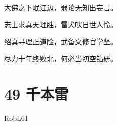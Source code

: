 \documentclass[UTF8,12pt,oneside]{ctexbook}
\begin{document}
        \begin{center}
            大佛之下岷江边，弱论无知出妄言。
       
            志士求真天理胜，雷犬吠日世人怜。
            
            绍真寻理正道险，武备文修官学坚。
        
            尽力十年终败北，何必当初空钻研。
        \end{center}
        
        \newpage
        
        \section{49 千本雷}
        \begin{center}
            RobL61
        \end{center}
        
\end{document}
